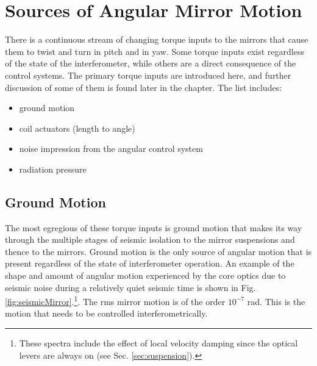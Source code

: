 \section{Sources of Angular Mirror Motion}
There is a continuous stream of changing torque inputs to the mirrors that cause them to twist and turn in pitch and in yaw. Some torque inputs exist regardless of the state of the interferometer, while others are a direct consequence of the control systems. The primary torque inputs are introduced here, and further discussion of some of them is found later in the chapter. The list includes:
\begin{itemize}
\item ground motion \vspace{-10pt} 
\item coil actuators (length to angle) \vspace{-10pt}
\item noise impression from the angular control system \vspace{-10pt}
\item radiation pressure
\end{itemize}




\subsection{Ground Motion} 
\label{sec:oplevspectra}
The most egregious of these torque inputs is ground motion that makes its way through the multiple stages of seismic isolation to the mirror suspensions and thence to the mirrors. Ground motion is the only source of angular motion that is present regardless of the state of interferometer operation. An example of the shape and amount of angular motion experienced by the core optics due to seismic noise during a relatively quiet seismic time is shown in Fig. \ref{fig:seismicMirror}.\footnote{These spectra include the effect of local velocity damping since the optical levers are always on (see Sec. \ref{sec:suspension}).}. The rms mirror motion is of the order $10^{-7}$ rad. This is the motion that needs to be controlled interferometrically.

